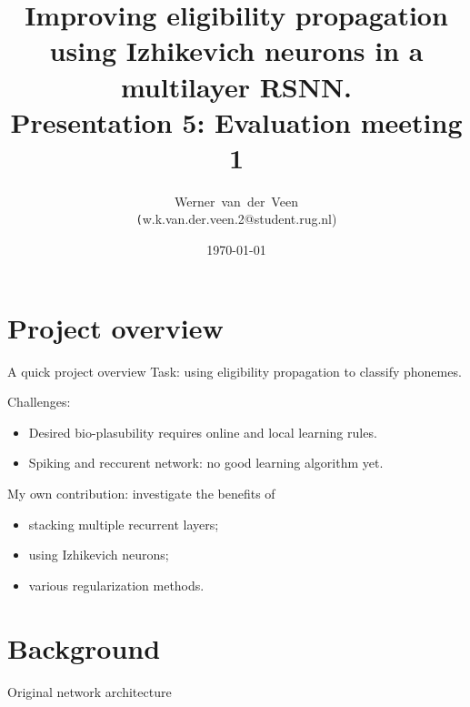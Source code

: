 \documentclass[t]{beamer}
\title[Eligibility propagation]{Improving eligibility propagation using Izhikevich neurons in a multilayer RSNN.\\\vspace{10pt}
\large{Presentation 5: Evaluation meeting 1}}
\author[Werner]{Werner~van~der~Veen\\\footnotesize\texttt({w.k.van.der.veen.2@student.rug.nl})}\date{\today}
\begin{document}
\begin{frame}
    \titlepage
\end{frame}



\small
\section{Project overview}
\begin{frame}{A quick project overview}
	Task: using eligibility propagation to classify phonemes.

	Challenges:
	\begin{itemize}[label=--]
		\item Desired bio-plasubility requires online and local learning rules.
		\item Spiking and reccurent network: no good learning algorithm yet.
	\end{itemize}

	My own contribution: investigate the benefits of
	\begin{itemize}[label=--]
		\item stacking multiple recurrent layers;
		\item using Izhikevich neurons;
		\item various regularization methods.
	\end{itemize}

\end{frame}

\section{Background}
\begin{frame}{Original network architecture}
	\begin{figure}[!ht]
		
	\end{figure}
\end{frame}
\end{document}
